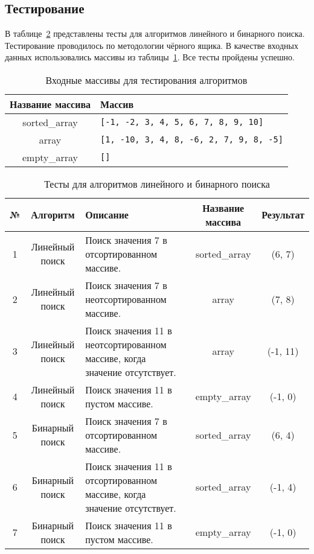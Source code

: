 \subsection{Тестирование}

В таблице~\ref{table:tests} представлены тесты для алгоритмов линейного и бинарного поиска. Тестирование проводилось по методологии чёрного ящика. В качестве входных данных использовались массивы из таблицы~\ref{table:arrays}. Все тесты пройдены успешно.

\begin{table}[H]
\caption{\centering Входные массивы для тестирования алгоритмов}
\small
\centering\begin{tabular}{|c|m{10cm}|}
        \hline
        \textbf{Название массива} & \textbf{Массив} \\
        \hline
        sorted\_array & \texttt{[-1, -2, 3, 4, 5, 6, 7, 8, 9, 10]} \\
        \hline
        array & \texttt{[1, -10, 3, 4, 8, -6, 2, 7, 9, 8, -5]} \\
        \hline
        empty\_array & \texttt{[]} \\
        \hline
    \end{tabular}
\label{table:arrays}
\end{table}

\begin{table}[H]
\caption{\centering Тесты для алгоритмов линейного и бинарного поиска}
\small
\centering\begin{tabular}{|c|c|m{5cm}|c|c|}
        \hline
        \textbf{№} & \textbf{Алгоритм} & \textbf{Описание} & \textbf{Название массива} & \textbf{Результат} \\
        \hline
        1 & Линейный поиск & Поиск значения 7 в отсортированном массиве. & sorted\_array & (6, 7) \\
        \hline
        2 & Линейный поиск & Поиск значения 7 в неотсортированном массиве. & array & (7, 8) \\
        \hline
        3 & Линейный поиск & Поиск значения 11 в неотсортированном массиве, когда значение отсутствует. & array & (-1, 11) \\
        \hline
        4 & Линейный поиск & Поиск значения 11 в пустом массиве. & empty\_array & (-1, 0) \\
        \hline
        5 & Бинарный поиск & Поиск значения 7 в отсортированном массиве. & sorted\_array & (6, 4) \\
        \hline
        6 & Бинарный поиск & Поиск значения 11 в отсортированном массиве, когда значение отсутствует. & sorted\_array & (-1, 4) \\
        \hline
        7 & Бинарный поиск & Поиск значения 11 в пустом массиве. & empty\_array & (-1, 0) \\
        \hline
    \end{tabular}
\label{table:tests}
\end{table}

